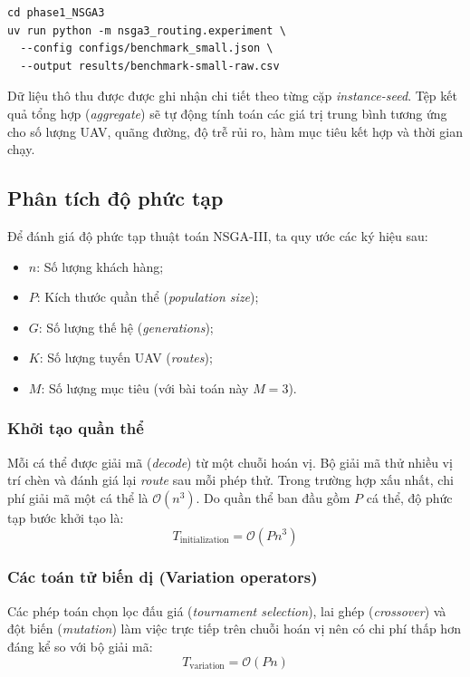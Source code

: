 \documentclass{article}
\begin{document}
\begin{verbatim}
cd phase1_NSGA3
uv run python -m nsga3_routing.experiment \
  --config configs/benchmark_small.json \
  --output results/benchmark-small-raw.csv
\end{verbatim}

Dữ liệu thô thu được được ghi nhận chi tiết theo từng cặp \textit{instance-seed}. Tệp kết quả tổng hợp (\textit{aggregate}) sẽ tự động tính toán các giá trị trung bình tương ứng cho số lượng UAV, quãng đường, độ trễ rủi ro, hàm mục tiêu kết hợp và thời gian chạy.

\subsection{Phân tích độ phức tạp}

Để đánh giá độ phức tạp thuật toán NSGA-III, ta quy ước các ký hiệu sau:
\begin{itemize}
    \item $n$: Số lượng khách hàng;
    \item $P$: Kích thước quần thể (\textit{population size});
    \item $G$: Số lượng thế hệ (\textit{generations});
    \item $K$: Số lượng tuyến UAV (\textit{routes});
    \item $M$: Số lượng mục tiêu (với bài toán này $M = 3$).
\end{itemize}

\subsubsection{Khởi tạo quần thể}
Mỗi cá thể được giải mã (\textit{decode}) từ một chuỗi hoán vị. Bộ giải mã thử nhiều vị trí chèn và đánh giá lại \textit{route} sau mỗi phép thử. Trong trường hợp xấu nhất, chi phí giải mã một cá thể là $\mathcal{O}(n^3)$. Do quần thể ban đầu gồm $P$ cá thể, độ phức tạp bước khởi tạo là:
\begin{equation}
    T_{\text{initialization}} = \mathcal{O}(P n^3)
\end{equation}

\subsubsection{Các toán tử biến dị (Variation operators)}
Các phép toán chọn lọc đấu giá (\textit{tournament selection}), lai ghép (\textit{crossover}) và đột biến (\textit{mutation}) làm việc trực tiếp trên chuỗi hoán vị nên có chi phí thấp hơn đáng kể so với bộ giải mã:
\begin{equation}
    T_{\text{variation}} = \mathcal{O}(P n)
\end{equation}
\end{document}
